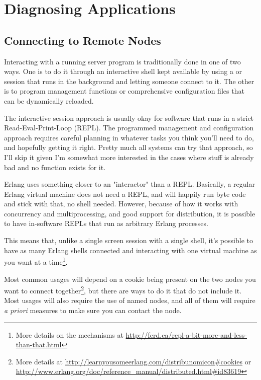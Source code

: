 \documentclass[11pt, oneside]{book}   	%
\begin{document}

\part{Diagnosing Applications}
\label{part:diagnosing-applictions}


\chapter{Connecting to Remote Nodes}
\label{chap:connecting}

Interacting with a running server program is traditionally done in one of two ways. One is to do it through an interactive shell kept available by using a  or  session that runs in the background and letting someone connect to it. The other is to program management functions or comprehensive configuration files that can be dynamically reloaded.

The interactive session approach is usually okay for software that runs in a strict Read-Eval-Print-Loop (REPL). The programmed management and configuration approach requires careful planning in whatever tasks you think you'll need to do, and hopefully getting it right. Pretty much all systems can try that approach, so I'll skip it given I'm somewhat more interested in the cases where stuff is already bad and no function exists for it.

Erlang uses something closer to an "interactor" than a REPL. Basically, a regular Erlang virtual machine does not need a REPL, and will happily run byte code and stick with that, no shell needed. However, because of how it works with concurrency and multiprocessing, and good support for distribution, it is possible to have in-software REPLs that run as arbitrary Erlang processes.

This means that, unlike a single screen session with a single shell, it's possible to have as many Erlang shells connected and interacting with one virtual machine as you want at a time\footnote{More details on the mechanisms at \href{http://ferd.ca/repl-a-bit-more-and-less-than-that.html}{http://ferd.ca/repl-a-bit-more-and-less-than-that.html}}.

Most common usages will depend on a cookie being present on the two nodes you want to connect together\footnote{More details at \href{http://learnyousomeerlang.com/distribunomicon\#cookies}{http://learnyousomeerlang.com/distribunomicon\#cookies} or \href{http://www.erlang.org/doc/reference\_manual/distributed.html\#id83619}{http://www.erlang.org/doc/reference\_manual/distributed.html\#id83619}}, but there are ways to do it that do not include it. Most usages will also require the use of named nodes, and all of them will require \emph{a priori} measures to make sure you can contact the node.
\end{document}
